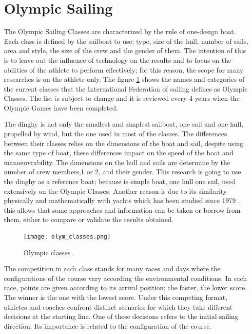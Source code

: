 \section {Olympic Sailing} \label{sec:olympic classes}
The Olympic Sailing Classes are characterized by the rule of one-design boat. Each class is defined by the sailboat to use; type, size of the hull, number of sails, area and style, the size of the crew and the gender of them.  The intention of this is to leave out the influence of technology on the results and to focus on the abilities of the athlete to perform effectively; for this reason, the scope for many researches is on the athlete only. The figure \ref{fig:olymp_cla} shows the names and categories of the current classes that the International Federation of sailing defines as Olympic Classes. The list is subject to change and it is reviewed every 4 years when the Olympic Games have been completed.\par 
The dinghy is not only the smallest and simplest sailboat, one sail and one hull, propelled by wind, but the one used in most of the classes. The differences between their classes relies on the dimensions of the boat and sail, despite using the same type of boat, these differences impact on the speed of the boat and manoeuvrability. The dimensions on the hull and sails are determine by the number of crew members,1 or 2, and their gender. This research is going to use the dinghy as a reference boat; because is simple boat, one hull one sail, used extensively on the Olympic Classes. Another reason is due to its similarity physically and mathematically with yachts which has been studied since 1979 \cite{marchajaereo1979}, this allows that some approaches and information can be taken or borrow from them, either to compare or validate the results obtained.\par 

\begin{figure}[ht]
\centering
 \texttt{[image: olym\_classes.png]}
  \caption{Olympic classes \cite{sailoly}.}
\label{fig:olymp_cla} 
\end{figure}

The competition in each class stands for many races and days where the configurations of the course vary according the environmental conditions. In each race, points are given according to its arrival position; the faster, the lower score. The winner is the one with the lowest score. Under this competing format, athletes and coaches confront distinct scenarios for which they take different decisions at the starting line. One of these decisions refers to the initial sailing direction. Its importance is related to the configuration of the course.\par 

